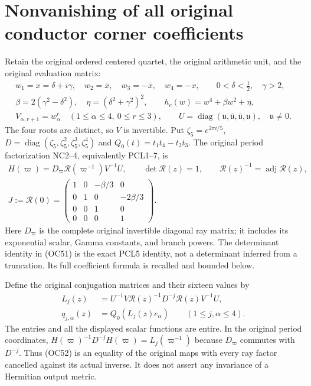 \section{Nonvanishing of all original conductor corner coefficients}
\label{sec:OC-original-corners}

Retain the original ordered centered quartet, the original arithmetic unit,
and the original evaluation matrix:
\[
 \begin{gathered}
 w_1=x=\delta+i\gamma,\quad w_2=\bar x,\quad
 w_3=-\bar x,\quad w_4=-x,\qquad 0<\delta<\tfrac12,\quad\gamma>2,\\
 \beta=2(\gamma^2-\delta^2),\quad\eta=(\delta^2+\gamma^2)^2,
 \qquad h_c(w)=w^4+\beta w^2+\eta,\\
 V_{\alpha,r+1}=w_\alpha^r\quad(1\le\alpha\le4,\ 0\le r\le3),
 \qquad U=\operatorname{diag}(\mathfrak u,\overline{\mathfrak u},
                    \overline{\mathfrak u},\mathfrak u),\quad\mathfrak u\ne0.
 \end{gathered}\tag{OC50}\label{eq:OC50}
\]
The four roots are distinct, so $V$ is invertible. Put
$\zeta_5=e^{2\pi i/5}$,
$D=\operatorname{diag}(\zeta_5,\zeta_5^2,\zeta_5^3,\zeta_5^4)$ and
$Q_0(t)=t_1t_4-t_2t_3$. The original period factorization NC2--4,
equivalently PCL1--7, is
\[
 \begin{gathered}
 H(\varpi)=D_\varpi\mathcal R(\varpi^{-1})V^{-1}U,
 \qquad \det\mathcal R(z)=1,\qquad
 \mathcal R(z)^{-1}=\operatorname{adj}\mathcal R(z),\\
 J:=\mathcal R(0)=
 \begin{pmatrix}1&0&-\beta/3&0\\0&1&0&-2\beta/3\\
 0&0&1&0\\0&0&0&1\end{pmatrix}.
 \end{gathered}\tag{OC51}\label{eq:OC51}
\]
Here $D_\varpi$ is the complete original invertible diagonal ray matrix;
it includes its exponential scalar, Gamma constants, and branch powers.
The determinant identity in (OC51) is the exact PCL5 identity, not a
determinant inferred from a truncation. Its full coefficient formula is
recalled and bounded below.

Define the original conjugation matrices and their sixteen values by
\[
 \begin{split}
 L_j(z)&=U^{-1}V\mathcal R(z)^{-1}D^{-j}\mathcal R(z)V^{-1}U,\\
 q_{j,\alpha}(z)&=Q_0(L_j(z)e_\alpha)
       \qquad(1\le j,\alpha\le4).
 \end{split}\tag{OC52}\label{eq:OC52}
\]
The entries and all the displayed scalar functions are entire. In the
original period coordinates,
$H(\varpi)^{-1}D^{-j}H(\varpi)=L_j(\varpi^{-1})$ because
$D_\varpi$ commutes with $D^{-j}$. Thus (OC52) is an equality of the
original maps with every ray factor cancelled against its actual inverse.
It does not assert any invariance of a Hermitian output metric.

